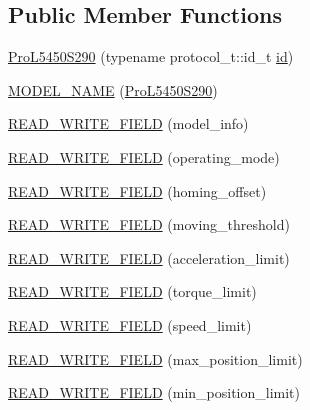 \subsection*{Public Member Functions}
\begin{DoxyCompactItemize}
\item 
\hyperlink{classdynamixel_1_1servos_1_1_pro_l5450_s290_ab48d4699e02dd7b9feb06737213f9adc}{Pro\+L5450\+S290} (typename protocol\+\_\+t\+::id\+\_\+t \hyperlink{classdynamixel_1_1servos_1_1_servo_a2d022081672e25a7bb57b76706e1cc57}{id})
\item 
\hyperlink{classdynamixel_1_1servos_1_1_pro_l5450_s290_a4c93092276d36fc242b502ccee3e3770}{M\+O\+D\+E\+L\+\_\+\+N\+A\+M\+E} (\hyperlink{classdynamixel_1_1servos_1_1_pro_l5450_s290}{Pro\+L5450\+S290})
\item 
\hyperlink{classdynamixel_1_1servos_1_1_pro_l5450_s290_afdfc2eea9418f8a34d5ce47217f8b0ae}{R\+E\+A\+D\+\_\+\+W\+R\+I\+T\+E\+\_\+\+F\+I\+E\+L\+D} (model\+\_\+info)
\item 
\hyperlink{classdynamixel_1_1servos_1_1_pro_l5450_s290_adb5c4cf685b9289863faa8d8bdabc90a}{R\+E\+A\+D\+\_\+\+W\+R\+I\+T\+E\+\_\+\+F\+I\+E\+L\+D} (operating\+\_\+mode)
\item 
\hyperlink{classdynamixel_1_1servos_1_1_pro_l5450_s290_a6a862369792c16ab70d47e438886cfe3}{R\+E\+A\+D\+\_\+\+W\+R\+I\+T\+E\+\_\+\+F\+I\+E\+L\+D} (homing\+\_\+offset)
\item 
\hyperlink{classdynamixel_1_1servos_1_1_pro_l5450_s290_aecc4b318e6646393d58c4607bda6903b}{R\+E\+A\+D\+\_\+\+W\+R\+I\+T\+E\+\_\+\+F\+I\+E\+L\+D} (moving\+\_\+threshold)
\item 
\hyperlink{classdynamixel_1_1servos_1_1_pro_l5450_s290_ae20daaf6e3673a3a3fc9c9c2cbf15cbc}{R\+E\+A\+D\+\_\+\+W\+R\+I\+T\+E\+\_\+\+F\+I\+E\+L\+D} (acceleration\+\_\+limit)
\item 
\hyperlink{classdynamixel_1_1servos_1_1_pro_l5450_s290_a4ffb669959117517221e76b491d6808b}{R\+E\+A\+D\+\_\+\+W\+R\+I\+T\+E\+\_\+\+F\+I\+E\+L\+D} (torque\+\_\+limit)
\item 
\hyperlink{classdynamixel_1_1servos_1_1_pro_l5450_s290_a83635258cae7faa9c0f7d5888611abc7}{R\+E\+A\+D\+\_\+\+W\+R\+I\+T\+E\+\_\+\+F\+I\+E\+L\+D} (speed\+\_\+limit)
\item 
\hyperlink{classdynamixel_1_1servos_1_1_pro_l5450_s290_a247dad551d8c796cc2680f02d271530b}{R\+E\+A\+D\+\_\+\+W\+R\+I\+T\+E\+\_\+\+F\+I\+E\+L\+D} (max\+\_\+position\+\_\+limit)
\item 
\hyperlink{classdynamixel_1_1servos_1_1_pro_l5450_s290_a6b19193767067ba8d234aed951e70efb}{R\+E\+A\+D\+\_\+\+W\+R\+I\+T\+E\+\_\+\+F\+I\+E\+L\+D} (min\+\_\+position\+\_\+limit)

\end{DoxyCompactItemize}
